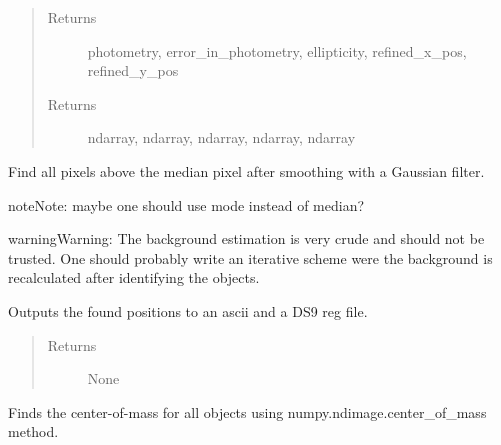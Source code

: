 \documentclass[a4paper,12pt,english]{sphinxmanual}
\begin{document}
\begin{fulllineitems}
\begin{fulllineitems}
\begin{quote}
\begin{description}
\item[{Returns}] \leavevmode
photometry, error\_in\_photometry, ellipticity, refined\_x\_pos, refined\_y\_pos

\item[{Returns}] \leavevmode
ndarray, ndarray, ndarray, ndarray, ndarray

\end{description}\end{quote}

\end{fulllineitems}


\begin{fulllineitems}
Find all pixels above the median pixel after smoothing with a Gaussian filter.

\begin{notice}{note}{Note:}
maybe one should use mode instead of median?
\end{notice}

\begin{notice}{warning}{Warning:}
The background estimation is very crude and should not be trusted. One should probably write
an iterative scheme were the background is recalculated after identifying the objects.
\end{notice}

\end{fulllineitems}


\begin{fulllineitems}
Outputs the found positions to an ascii and a DS9 reg file.
\begin{quote}\begin{description}
\item[{Returns}] \leavevmode
None

\end{description}\end{quote}

\end{fulllineitems}


\begin{fulllineitems}
Finds the center-of-mass for all objects using numpy.ndimage.center\_of\_mass method.


\end{fulllineitems}
\end{fulllineitems}
\end{document}
